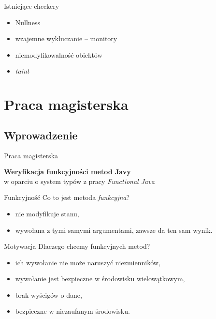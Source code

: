 \documentclass{beamer}
\begin{document}
\begin{frame}{Istniejące checkery}
\begin{itemize}
\item<1-> Nullness
\item<2-> wzajemne wykluczanie -- monitory
\item<3-> niemodyfikowalność obiektów
\item<4-> \emph{taint}
\end{itemize}
\end{frame}

\section{Praca magisterska}

\subsection{Wprowadzenie}

\begin{frame}{Praca magisterska}
\begin{center}
  \textbf{Weryfikacja funkcyjności metod Javy}\\
  w oparciu o system typów z pracy \emph{Functional Java}
\end{center}
\end{frame}

\begin{frame}{Funkcyjność}
  Co to jest metoda \emph{funkcyjna}?
  \begin{itemize}
  \item<1-> nie modyfikuje stanu,
  \item<2-> wywołana z tymi samymi argumentami, zawsze da ten sam wynik.
  \end{itemize}
\end{frame}

\begin{frame}{Motywacja}
  Dlaczego chcemy funkcyjnych metod?
  \begin{itemize}
  \item<1-> ich wywołanie nie może naruszyć niezmienników,
  \item<2-> wywołanie jest bezpieczne w środowisku wielowątkowym, 
  \item<2-> brak wyścigów o dane,
  \item<3-> bezpieczne w niezaufanym środowisku.
  \end{itemize}
\end{frame}
\end{document}
